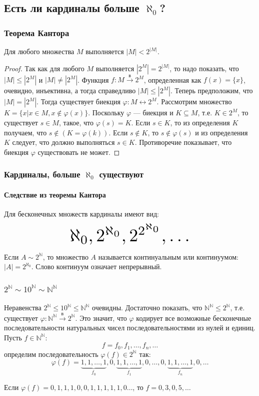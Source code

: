 \subsection{Есть ли кардиналы больше $\aleph_0$?}

\begin{frame}
    \frametitle{Теорема Кантора}
    
    \begin{theorem}[Кантора]
        Для любого множества $M$ выполняется $|M|<2^{|M|}$.
    \end{theorem}
    \begin{proof}
        Так как для любого $M$ выполняется $|2^M|=2^{|M|}$, то надо показать, что $|M|\leq|2^M|$ и $|M|\neq|2^M|$. Функция $f:M\xrightarrow{\text{в}}2^M$, определенная как $f(x)=\{x\}$, очевидно, инъективна, а тогда справедливо $|M|\leq|2^M|$. Теперь предположим, что $|M|=|2^M|$. Тогда существует биекция $\varphi:M\leftrightarrow 2^M$. Рассмотрим множество $K=\{x|x\in M,x\not\in\varphi(x)\}$. Поскольку $\varphi$ --- биекция и $K\subseteq M$, т.е. $K\in 2^M$, то существует $s\in M$, такое, что $\varphi(s)=K$. Если $s\in K$, то из определения $K$ получаем, что $s\not\in(K=\varphi(k))$. Если $s\not\in K$, то $s\not\in\varphi(s)$ и из определения $K$ следует, что должно выполняться $s\in K$. Противоречие показывает, что биекция $\varphi$ существовать не может.
    \end{proof}
\end{frame}

\begin{frame}
    \frametitle{Кардиналы, больше $\aleph_0$ существуют}
    \framesubtitle{Следствие из теоремы Кантора}
    
    Для бесконечных множеств кардиналы имеют вид: 
    \[
    \resizebox{.5\textwidth}{!}{$\aleph_0, 2^{\aleph_0}, 2^{2^{\aleph_0}}, \ldots$}
    \]
    
    Если $A\sim 2^{\mathbb{N}}$, то множество $A$ называется \alert{континуальным} или \alert{континуумом}: $|A|=2^{\aleph_0}$. Слово континуум означает непрерывный.
\end{frame}

\begin{frame}
    \frametitle{$2^\mathbb{N}\sim 10^\mathbb{N}\sim \mathbb{N}^\mathbb{N}$}
    
    Неравенства $2^\mathbb{N}\leq 10^\mathbb{N}\leq \mathbb{N}^\mathbb{N}$ очевидны. Достаточно показать, что $\mathbb{N}^\mathbb{N}\leq 2^\mathbb{N}$, т.е. существует $\varphi:\mathbb{N}^\mathbb{N}\xrightarrow{\text{в}}2^\mathbb{N}$. Это значит, что $\varphi$ кодирует все возможные бесконечные последовательности натуральных чисел последовательностями из нулей и единиц. Пусть $f\in\mathbb{N}^\mathbb{N}$:
    \[f=f_0,f_1,\ldots,f_n,\ldots\]
    определим последовательность $\varphi(f)\in 2^\mathbb{N}$ так:
    \[
        \varphi(f)=\underbrace{1,1,\ldots,1}_{f_0},0,
        \underbrace{1,1,\ldots,1}_{f_1},0,\ldots,0,
        \underbrace{1,1,\ldots,1}_{f_n},0,\ldots
    \]
    \begin{example}
        Если $\varphi(f)=0,1,1,1,0,0,1,1,1,1,1,0\ldots$, то $f=0,3,0,5,\ldots$
    \end{example}
\end{frame}

